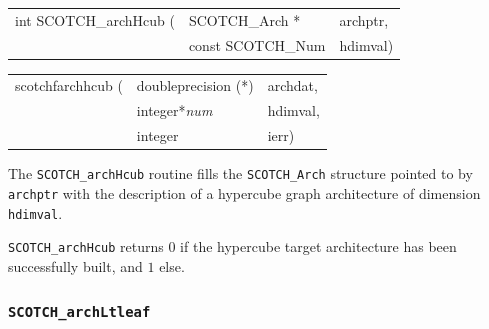 \begin{itemize}
\progsyn

{\tt\begin{tabular}{l@{}ll}
int SCOTCH\_archHcub ( & SCOTCH\_Arch *    & archptr, \\
                       & const SCOTCH\_Num & hdimval)
\end{tabular}}

{\tt\begin{tabular}{l@{}ll}
scotchfarchhcub ( & doubleprecision (*) & archdat, \\
                  & integer*{\it num}   & hdimval, \\
                  & integer             & ierr)
\end{tabular}}

\progdes

The {\tt SCOTCH\_archHcub} routine fills the {\tt SCOTCH\_\lbt Arch}
structure pointed to by {\tt archptr} with the description of a
hypercube graph architecture of dimension {\tt hdimval}.

\progret

{\tt SCOTCH\_archHcub} returns $0$ if the hypercube target
architecture has been successfully built, and $1$ else.
\end{itemize}

\subsubsection{{\tt SCOTCH\_archLtleaf}}

